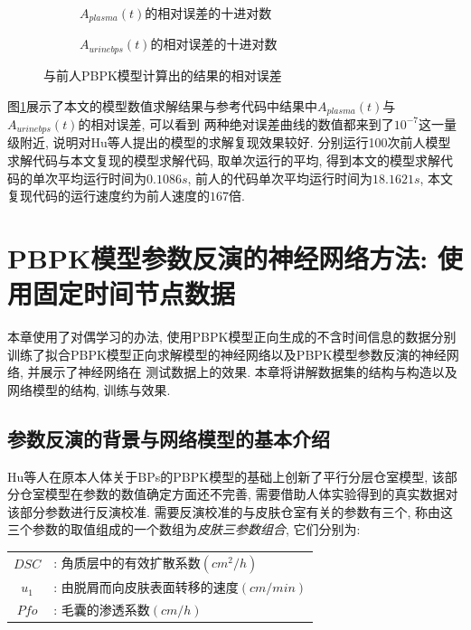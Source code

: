 \documentclass[a4paper,punct=banjiao,twoside]{ctexrep}
\theoremstyle{plain}
\theoremstyle{definition}
\theoremstyle{remark}
\begin{document}
\begin{figure}[H]
  \centering
  \begin{subfigure}{0.6\textwidth}
    \centering
    \resizebox{1\textwidth}{!}{}
    \caption{$A_{plasma}(t)$的相对误差的十进对数}
  \end{subfigure}
  \begin{subfigure}{0.6\textwidth}
    \centering
    \resizebox{1\textwidth}{!}{}
    \caption{$A_{urinebps}(t)$的相对误差的十进对数}
  \end{subfigure}
  \caption{与前人PBPK模型计算出的结果的相对误差}
  \label{PBPK模型结果对比}
\end{figure}


图\ref{PBPK模型结果对比}展示了本文的模型数值求解结果与参考代码\cite{12}中结果中$A_{plasma}(t)$与$A_{urinebps}(t)$的相对误差, 可以看到
两种绝对误差曲线的数值都来到了$10^{-7}$这一量级附近, 说明对Hu等人\cite{11}提出的模型的求解复现效果较好.
分别运行100次前人模型求解代码与本文复现的模型求解代码, 取单次运行的平均, 得到本文的模型求解代码的单次平均运行时间为$0.1086s$, 前人的代码单次平均运行时间为$18.1621s$,
本文复现代码的运行速度约为前人速度的$167$倍.


\chapter{PBPK模型参数反演的神经网络方法: 使用固定时间节点数据}

本章使用了对偶学习的办法, 使用PBPK模型正向生成的不含时间信息的数据分别训练了拟合PBPK模型正向求解模型的神经网络以及PBPK模型参数反演的神经网络, 并展示了神经网络在
测试数据上的效果. 本章将讲解数据集的结构与构造以及网络模型的结构, 训练与效果.
\section{参数反演的背景与网络模型的基本介绍}
\label{3.1}
Hu等人\cite{11}在原本人体关于BPs的PBPK模型的基础上创新了平行分层仓室模型, 该部分仓室模型在参数的数值确定方面还不完善, 需要借助人体实验得到的真实数据对
该部分参数进行反演校准. 
需要反演校准的与皮肤仓室有关的参数有三个, 称由这三个参数的取值组成的一个数组为\textit{皮肤三参数组合}, 它们分别为:

\begin{table}[htbp]
  \centering
  \begin{tabular}[t]{|c*{1}{l}|}

    $DSC$ &: 角质层中的有效扩散系数$(cm^2/h)$ \\ 
  
    $u_1$  &: 由脱屑而向皮肤表面转移的速度$(cm/min)$ \\ 
  
    $Pfo$ &: 毛囊的渗透系数$(cm/h)$ \\ 

  \end{tabular}
\end{table}  
\end{document}
